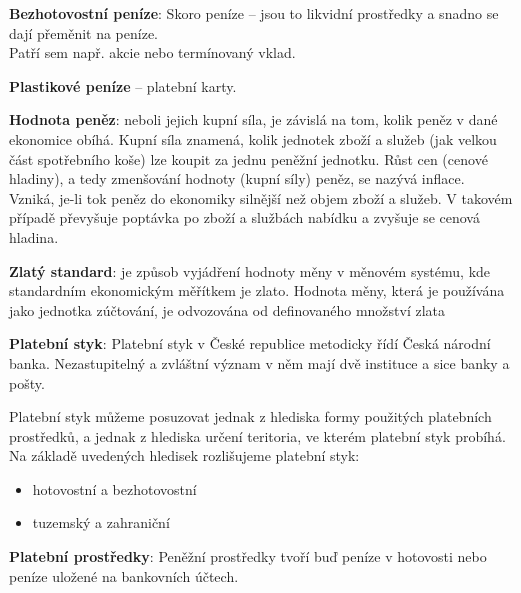 \textbf{Bezhotovostní peníze}: Skoro peníze -- jsou to likvidní prostředky a snadno se dají přeměnit na peníze. \\
Patří sem např. akcie nebo termínovaný vklad.

\textbf{Plastikové peníze} -- platební karty.

\textbf{Hodnota peněz}: neboli jejich kupní síla, je závislá na tom, kolik peněz v dané ekonomice obíhá. Kupní síla znamená, kolik jednotek zboží a služeb (jak velkou část spotřebního koše) lze koupit za jednu peněžní jednotku. Růst cen (cenové hladiny), a tedy zmenšování hodnoty (kupní síly) peněz, se nazývá inflace. Vzniká, je-li tok peněz do ekonomiky silnější než objem zboží a služeb. V takovém případě převyšuje poptávka po zboží a službách nabídku a zvyšuje se cenová hladina.

\textbf{Zlatý standard}: je způsob vyjádření hodnoty měny v měnovém systému, kde standardním ekonomickým měřítkem je zlato. Hodnota měny, která je používána jako jednotka zúčtování, je odvozována od definovaného množství zlata

\textbf{Platební styk}: Platební styk v České republice metodicky řídí Česká národní banka. Nezastupitelný a zvláštní význam v něm mají dvě instituce a sice banky a pošty.

Platební styk můžeme posuzovat jednak z hlediska formy použitých platebních prostředků, a jednak z hlediska určení teritoria, ve kterém platební styk probíhá. Na základě uvedených hledisek rozlišujeme platební styk:
\begin{itemize}
    \item hotovostní a bezhotovostní
    \item tuzemský a zahraniční
\end{itemize}

\textbf{Platební prostředky}: Peněžní prostředky tvoří buď peníze v hotovosti nebo peníze uložené na bankovních účtech.

